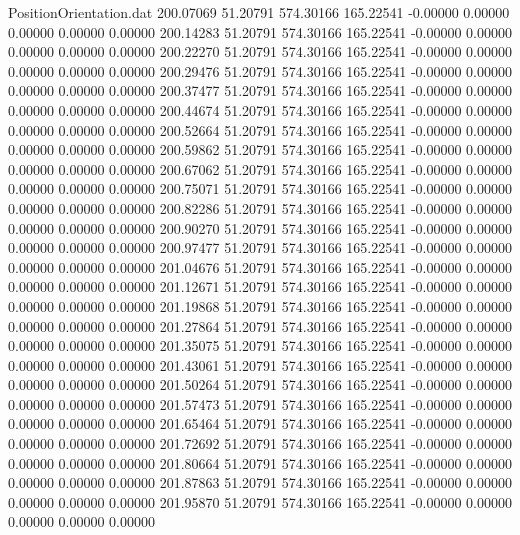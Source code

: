 \begin{filecontents}{PositionOrientation.dat}
 200.07069   51.20791  574.30166   165.22541   -0.00000    0.00000    0.00000    0.00000    0.00000
 200.14283   51.20791  574.30166   165.22541   -0.00000    0.00000    0.00000    0.00000    0.00000
 200.22270   51.20791  574.30166   165.22541   -0.00000    0.00000    0.00000    0.00000    0.00000
 200.29476   51.20791  574.30166   165.22541   -0.00000    0.00000    0.00000    0.00000    0.00000
 200.37477   51.20791  574.30166   165.22541   -0.00000    0.00000    0.00000    0.00000    0.00000
 200.44674   51.20791  574.30166   165.22541   -0.00000    0.00000    0.00000    0.00000    0.00000
 200.52664   51.20791  574.30166   165.22541   -0.00000    0.00000    0.00000    0.00000    0.00000
 200.59862   51.20791  574.30166   165.22541   -0.00000    0.00000    0.00000    0.00000    0.00000
 200.67062   51.20791  574.30166   165.22541   -0.00000    0.00000    0.00000    0.00000    0.00000
 200.75071   51.20791  574.30166   165.22541   -0.00000    0.00000    0.00000    0.00000    0.00000
 200.82286   51.20791  574.30166   165.22541   -0.00000    0.00000    0.00000    0.00000    0.00000
 200.90270   51.20791  574.30166   165.22541   -0.00000    0.00000    0.00000    0.00000    0.00000
 200.97477   51.20791  574.30166   165.22541   -0.00000    0.00000    0.00000    0.00000    0.00000
 201.04676   51.20791  574.30166   165.22541   -0.00000    0.00000    0.00000    0.00000    0.00000
 201.12671   51.20791  574.30166   165.22541   -0.00000    0.00000    0.00000    0.00000    0.00000
 201.19868   51.20791  574.30166   165.22541   -0.00000    0.00000    0.00000    0.00000    0.00000
 201.27864   51.20791  574.30166   165.22541   -0.00000    0.00000    0.00000    0.00000    0.00000
 201.35075   51.20791  574.30166   165.22541   -0.00000    0.00000    0.00000    0.00000    0.00000
 201.43061   51.20791  574.30166   165.22541   -0.00000    0.00000    0.00000    0.00000    0.00000
 201.50264   51.20791  574.30166   165.22541   -0.00000    0.00000    0.00000    0.00000    0.00000
 201.57473   51.20791  574.30166   165.22541   -0.00000    0.00000    0.00000    0.00000    0.00000
 201.65464   51.20791  574.30166   165.22541   -0.00000    0.00000    0.00000    0.00000    0.00000
 201.72692   51.20791  574.30166   165.22541   -0.00000    0.00000    0.00000    0.00000    0.00000
 201.80664   51.20791  574.30166   165.22541   -0.00000    0.00000    0.00000    0.00000    0.00000
 201.87863   51.20791  574.30166   165.22541   -0.00000    0.00000    0.00000    0.00000    0.00000
 201.95870   51.20791  574.30166   165.22541   -0.00000    0.00000    0.00000    0.00000    0.00000

\end{filecontents}
